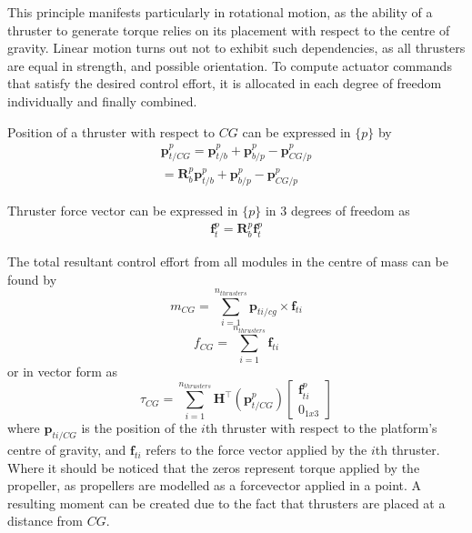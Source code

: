 This principle manifests particularly in rotational motion, as the ability of a thruster to generate torque relies on its placement with respect to the centre of gravity. Linear motion turns out not to exhibit such dependencies, as all thrusters are equal in strength, and possible orientation.  To compute actuator commands that satisfy the desired control effort,
it is allocated in each degree of freedom individually and finally combined.

Position of a thruster with respect to $CG$ can be expressed in $\{p\}$ by
\begin{equation}
\begin{split}
\textbf{p}_{t/CG}^{p} = \textbf{p}_{t/b}^{p} + \textbf{p}_{b/p}^{p} - \textbf{p}_{CG/p}^{p} \\
= \textbf{R}_{b}^{p} \textbf{p}_{t/b}^{p} + \textbf{p}_{b/p}^{p} - \textbf{p}_{CG/p}^{p}
\end{split}
\end{equation}

Thruster force vector can be expressed in $\{p\}$ in 3 degrees of freedom as
\begin{equation}
\begin{split}
\textbf{f}_{t}^{p} = \textbf{R}_{b}^{p} \textbf{f}_{t}^{p}
\end{split}
\end{equation}

The total resultant control effort from all modules in the centre of mass can be found by
\begin{equation}
m_{CG} = \sum_{i =1}^{n_{thrusters}} \textbf{p}_{ti/cg} \times \textbf{f}_{ti}
\label{torqueCG1}
\end{equation}
\begin{equation}
f_{CG} = \sum_{i =1}^{n_{thrusters}}  \textbf{f}_{ti}
\end{equation}
or in vector form as
\begin{equation}
\tau_{CG} = \sum_{i =1}^{n_{thrusters}}  \textbf{H}^{\top}(\textbf{p}_{t/CG}^{p}) \begin{bmatrix}
\textbf{f}_{ti}^{p} \\ 0_{1x3}
\end{bmatrix}
\end{equation}
where $\textbf{p}_{ti/CG}$ is the position of the $i$th thruster with respect to the platform's centre of gravity, and $\textbf{f}_{ti}$ refers to the force vector applied by the $i$th thruster.
Where it should be noticed that the zeros represent torque applied by the propeller, as propellers are modelled as a forcevector applied in a point. A resulting moment can be created due to the fact that thrusters are placed at a distance from $CG$.



